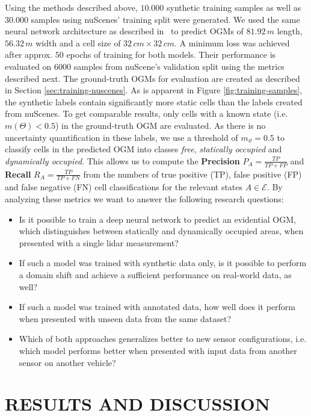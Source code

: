 \documentclass[conference]{IEEEtran}
\begin{document}
Using the methods described above, $10.000$ synthetic training samples as well as $30.000$ samples using nuScenes' training split were generated. We used the same neural network architecture as described in~\cite{vanKempen.2021b} to predict OGMs of $81.92\,m$ length, $56.32\,m$ width and a cell size of $32\,cm \times 32\,cm$. A minimum loss was achieved after approx. $50$ epochs of training for both models. Their performance is evaluated on $6000$ samples from nuScene's validation split using the metrics described next. The ground-truth OGMs for evaluation are created as described in Section \ref{sec:training-nuscenes}. As is apparent in Figure \ref{fig:training-samples}, the synthetic labels contain significantly more static cells than the labels created from nuScenes. To get comparable results, only cells with a known state (i.e. $m(\Theta) < 0.5$) in the ground-truth OGM are evaluated. As there is no uncertainty quantification in these labels, we use a threshold of $m_\vartheta = 0.5$ to classify cells in the predicted OGM into classes \textit{free}, \textit{statically occupied} and \textit{dynamically occupied}. This allows us to compute the \textbf{Precision} $P_A = \frac{TP}{TP + FP}$ and \textbf{Recall} $R_A = \frac{TP}{TP+FN}$ from the numbers of true positive (TP), false positive (FP) and false negative (FN) cell classifications for the relevant states $A \in \mathcal{E}$. By analyzing these metrics we want to answer the following research questions:
\begin{itemize}
    \item Is it possible to train a deep neural network to predict an evidential OGM, which distinguishes between statically and dynamically occupied areas, when presented with a single lidar measurement?
    \item If such a model was trained with synthetic data only, is it possible to perform a domain shift and achieve a sufficient performance on real-world data, as well?
    \item If such a model was trained with annotated data, how well does it perform when presented with unseen data from the same dataset?
    \item Which of both approaches generalizes better to new sensor configurations, i.e. which model performs better when presented with input data from another sensor on another vehicle?
\end{itemize}


\section{RESULTS AND DISCUSSION}
\end{document}
